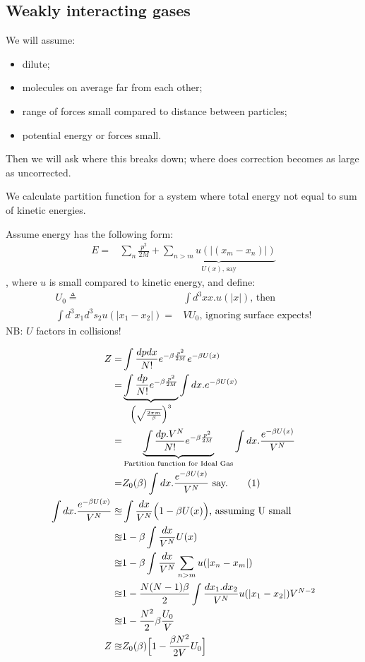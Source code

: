 \documentclass[]{article}
\newcommand\numberthis{\addtocounter{equation}{1}\tag{\theequation}}
\begin{document}
\subsection{Weakly interacting gases}

We will assume:
\begin{itemize}
	\item dilute;
	\item molecules on average far from each other;
	\item range of forces small compared to distance between particles;
	\item potential energy or forces small.
\end{itemize}

Then we will ask where this breaks down; where does correction becomes as large as uncorrected. 

We calculate partition function for a system where total energy not equal to sum of kinetic energies.

Assume energy has the following form:
\begin{align*}
E =& \sum_{n} \frac{p^2}{2M} + \underbrace{\sum_{n>m}u(\vert(x_m-x_n)\vert)}_{U(x)\text{, say}}
\end{align*}
, where $u$ is small compared to kinetic energy, and define:
\begin{align*}
U_0 \triangleq& \int d^3x x.u(\vert x \vert)\text{, then}\\
\int d^3x_1 d^3s_2 u(\vert x_1 - x_2\vert) = & V U_0\text{, ignoring surface expects!}
\end{align*}
NB: $U$ factors in collisions!

\begin{align*}
Z =& \int \frac{dp dx}{N!} e^{- \beta \frac{p^2}{2M}} e^{-\beta U(x)}\\
=&\underbrace{ \int \frac{dp}{N!} e^{- \beta \frac{p^2}{2M}}}_{\Big(\sqrt{\frac{2\pi m}{\beta}}\Big)^3} \int dx.e^{-\beta U(x)}\\
=&\underbrace{ \int \frac{dp.V^N}{N!} e^{- \beta \frac{p^2}{2M}}}_{\text{Partition function for Ideal Gas}} \int dx.\frac{e^{-\beta U(x)}}{V^N}\\
=&Z_0(\beta) \int dx.\frac{e^{-\beta U(x)}}{V^N}\text{ say.}\numberthis \label{eq:introducingZ0}\\
\int dx.\frac{e^{-\beta U(x)}}{V^N}\approxeq& \int \frac{dx}{V^N} \Big(1 - \beta U(x)\Big)\text{, assuming U small}\\
\approxeq & 1 - \beta \int \frac{dx}{V^N} U(x)\\
\approxeq & 1 - \beta \int \frac{dx}{V^N} \sum_{n>m} u(\vert x_n - x_m\vert)\\
\approxeq & 1 - \frac{N(N-1)\beta}{2} \int \frac{dx_1.dx_2}{V^N}  u(\vert x_1 - x_2\vert) V^{N-2}\\
\approxeq& 1 - \frac{N^2}{2}\beta \frac{U_0}{V}\\
Z \approxeq& Z_0(\beta) \Big[1 - \frac{\beta N^2}{2V} U_0\Big]
\end{align*}
\end{document}
